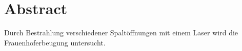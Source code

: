 \section{Abstract}
\label{sec:Abstract}
	Durch Bestrahlung verschiedener Spaltöffnungen mit einem Laser wird die Frauenhoferbeugung untersucht.